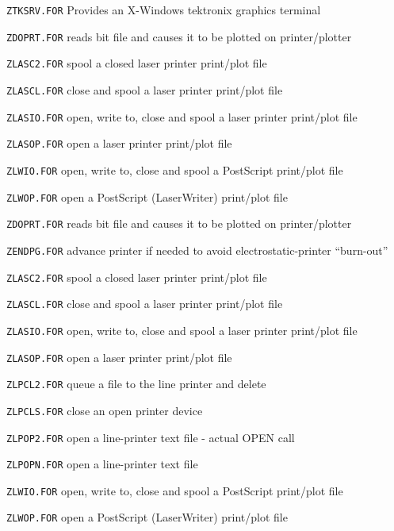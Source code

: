 {\item{\tt ZTKSRV.FOR} Provides an X-Windows tektronix graphics terminal

\medskip

\item{\tt ZDOPRT.FOR} reads bit file and causes it to be plotted on printer/plotter
\item{\tt ZLASC2.FOR} spool a closed laser printer print/plot file
\item{\tt ZLASCL.FOR} close and spool a laser printer print/plot file
\item{\tt ZLASIO.FOR} open, write to, close and spool a laser printer print/plot file
\item{\tt ZLASOP.FOR} open a laser printer print/plot file
\item{\tt ZLWIO.FOR} open, write to, close and spool a PostScript print/plot file
\item{\tt ZLWOP.FOR} open a PostScript (LaserWriter) print/plot file

\medskip

\item{\tt ZDOPRT.FOR} reads bit file and causes it to be plotted on printer/plotter
\item{\tt ZENDPG.FOR} advance printer if needed to avoid electrostatic-printer ``burn-out''
\item{\tt ZLASC2.FOR} spool a closed laser printer print/plot file
\item{\tt ZLASCL.FOR} close and spool a laser printer print/plot file
\item{\tt ZLASIO.FOR} open, write to, close and spool a laser printer print/plot file
\item{\tt ZLASOP.FOR} open a laser printer print/plot file
\item{\tt ZLPCL2.FOR} queue a file to the line printer and delete
\item{\tt ZLPCLS.FOR} close an open printer device
\item{\tt ZLPOP2.FOR} open a line-printer text file - actual OPEN call
\item{\tt ZLPOPN.FOR} open a line-printer text file
\item{\tt ZLWIO.FOR} open, write to, close and spool a PostScript print/plot file
\item{\tt ZLWOP.FOR} open a PostScript (LaserWriter) print/plot file

\medskip

}
